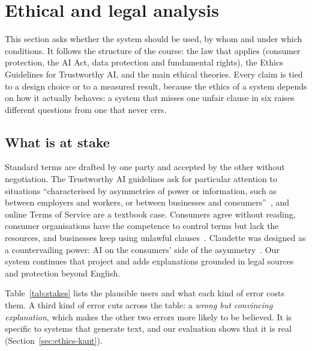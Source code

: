 \section{Ethical and legal analysis}
\label{sec:ethics}

This section asks whether the system should be used, by whom and under which conditions. It follows the structure of the course: the law that applies (consumer protection, the AI Act, data protection and fundamental rights), the Ethics Guidelines for Trustworthy AI, and the main ethical theories. Every claim is tied to a design choice or to a measured result, because the ethics of a system depends on how it actually behaves: a system that misses one unfair clause in six raises different questions from one that never errs.

\subsection{What is at stake}
\label{sec:ethics-stakes}

Standard terms are drafted by one party and accepted by the other without negotiation. The Trustworthy AI guidelines ask for particular attention to situations ``characterised by asymmetries of power or information, such as between employers and workers, or between businesses and consumers''~\citep{hleg2019}, and online Terms of Service are a textbook case. Consumers agree without reading, consumer organisations have the competence to control terms but lack the resources, and businesses keep using unlawful clauses~\citep{slides_claudette}. Claudette was designed as a countervailing power: AI on the consumers' side of the asymmetry~\citep{lippi2019claudette}. Our system continues that project and adds explanations grounded in legal sources and protection beyond English.

Table~\ref{tab:stakes} lists the plausible users and what each kind of error costs them. A third kind of error cuts across the table: a \emph{wrong but convincing explanation}, which makes the other two errors more likely to be believed. It is specific to systems that generate text, and our evaluation shows that it is real (Section~\ref{sec:ethics-kant}).

